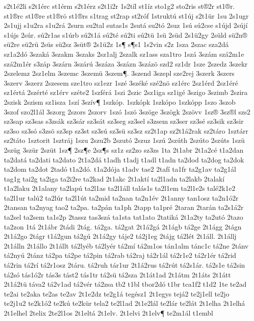 {s2t1é2li
s2t1érc
st1érm
s2t1érz
s2t1i2r
1s2tíl
st1íz
sto1g2
sto2ris
st®2r
st1®r.
st1®rc
st1®re
st1®rö
st1®rs
s1trag
st2rap
st2róf
1struktú
st1új
s2t1ür
1su
2s1ugr
2s1ujj
s1u2ra
s1u2rá
2surn
su2tal
sutas1s
2sutá
su2tó
2suz
1sú
sú2cse
s1újd
2sújí
s1újs
2súr.
sú2r1as
s1úrb
sú2t1á
sú2té
sú2ti
sú2tü
1sü
2süd
2s1ü2gy
2süld
sü2n®
sü2re
sü2rü
2süs
sü2sz
3süt®
2s1ü2z
1s¶
s¶s1
1s2vin
s2z
1sza
2szac
sza2dá
sz1a2dó
3szaká
3szakm
3szaks
2sz1alj
2szalk
sz1ass
sza1tro
1szá
3szám
szá2m1e
szá2m1ér
s3záp
3szárn
3szárú
3száza
3százn
3százö
szd2
sz1dr
1sze
2szedz
3szekr
2szelemz
2sz1elm
3szemc
3szemü
3szem¶.
3szend
3szepl
sze2rej
3szerk
3szers
3szerv
3szerz
2szesem
sze1tro
sz1ezr
1szé
3széké
szé2nö
sz1érc
2sz1érd
2sz1éré
sz1értá
2szérté
sz1érv
széte2
1szférá
1szi
2szic
2sz1iga
sz1igé
3szigo
3szimb
2szira
2szisk
2szism
sz1isza
1szí
3szív¶
1szkóp.
1szkópk
1szkópo
1szkópp
1szo
3szob
3szof
szo2l1ál
3szorg
2szors
2szorv
1szó
1szö
3szöge
3szögk
2szövv
1sz®
3sz®l
szs2
sz3sap
sz3sas
s3zsák
sz3sár
sz3sát
sz3seg
sz3sel
s3zsem
sz3ser
sz3sé
sz3sik
sz3sir
sz3so
sz3só
s3zsö
sz3sp
sz3st
sz3sú
sz3sü
sz3sz
sz2t1ap
sz2t1á2rak
sz2táro
1sztárr
sz2táto
1sztorit
1sztráj
1szu
2szu2b
2szutó
2szuz
1szú
2szúth
2szúto
2szúts
1szü
2szüg
3szür
2szüt
1sz¶
2sz¶e
2sz¶s
sz1z
sz2zo
sz3zs
1ta
2t1abr
2t1a2cé
t1a2dan
ta2datá
ta2dati
ta2dato
2t1a2dá
t1adh
t1adj
t1adl
t1adn
ta2dod
ta2dog
ta2dok
ta2dom
ta2dot
2tadó
t1a2dó.
t1a2dója
t1adv
tae2
2tafí
ta1fr
ta2g1av
ta2g1ál
tag1g
tai2g
ta2iga
ta2i2re
ta2kad
2t1akc
2t1aktí
ta2l1adn
ta2lakb
2talakí
t1a2laku
2t1alany
ta2lapú
ta2l1as
ta2l1áll
talás1s
ta2l1em
ta2l1e2s
talé2k1e2
ta2l1ur
talú2
ta2lúr
ta2l1út
ta2mid
ta2nan
ta2n1év
2t1anny
tan1osz
ta2n1ó2r
2tansan
ta2nyag
tao2
ta2pa.
ta2pán
ta1ph
2tapp
ta1pré
2taran
2tarán
ta2s1á2r
ta2sel
ta2sem
ta1s2p
2tassz
tas3szá
ta1sta
tat1ato
2tatiká
2t1a2ty
ta2utó
2tazo
ta2zon
1tá
2t1ábr
2tádi
2tág.
tá2ga.
tá2gat
2t1á2gá
2t1ágb
tá2ge
2t1ágg
2tágn
2t1á2go
2tágr
t1á2gun
tá2gú
2t1á2gy
táje2
tá2j1eg
2tájg
tá2lét
2t1áll.
2t1állj
2t1álln
2t1állo
2t1állt
tá2lyéb
tá2lyér
tá2mí
tá2m1os
tán1alm
tánc1c
tá2ne
2tánv
tá2nyú
2tánz
tá2pa
tá2pe
tá2pin
tá2rab
tá2raj
tá2r1ál
tá2r1e2
tá2r1ér
tá2rid
tá2rin
tá2rí
tá2r1osz
2táru.
tá2ruh
tár1ur
2t1á2rus
tá2rút
tá2s1ár.
tá2s1e
tá2sin
tá2só
tás1ó2r
tás3s
tást2
tás1tr
tá2sü
tá2sza
2t1át1ad
2t1átm
2t1áts
2t1átt
2t1á2tü
táva2
tá2v1ad
tá2vér
tá2zsa
tb2
t1bl
tbor2dó
t1br
tca1f2
t1d2
1te
te2ad
te2ai
te2aka
te2as
te2av
2t1e2dz
te2g1á
tegész1
2t1egys
tejá2
te2j1ell
te2jo
te2j1u2
te2k1ó2
te2kú
te2kür
tela2
te2l1ad
2t1e2lál
te2lár
te2lát
2t1elha
2t1elhá
2t1elhel
2telix
2te2l1os
2t1eltá
2t1elv.
2t1elvi
2t1elv¶
te2m1ál
t1embl
}
